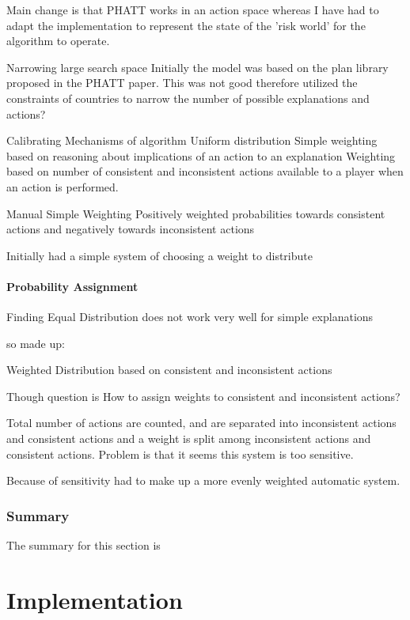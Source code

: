 \documentclass[parskip]{cs4rep}
\begin{document}
Main change is that PHATT works in an action space whereas I have had to adapt the implementation to represent the state of the 'risk world' for the algorithm to operate.

Narrowing large search space
Initially the model was based on the plan library proposed in the PHATT paper. This was not good therefore utilized the constraints of countries to narrow the number of possible explanations and actions?

Calibrating Mechanisms of algorithm
Uniform distribution
Simple weighting based on reasoning about implications of an action to an explanation
Weighting based on number of consistent and inconsistent actions available to a player when an action is performed.

Manual Simple Weighting
Positively weighted probabilities towards consistent actions and negatively towards inconsistent actions

Initially had a simple system of choosing a weight to distribute

\subsubsection{Probability Assignment}

Finding
Equal Distribution does not work very well for simple explanations

so made up:

Weighted Distribution based on consistent and inconsistent actions

Though question is How to assign weights to consistent and inconsistent actions?

Total number of actions are counted, and are separated into inconsistent actions and consistent actions and a weight is split among inconsistent actions and consistent actions. Problem is that it seems this system is too sensitive.

Because of sensitivity had to make up a more evenly weighted automatic system.

\subsection{Summary}

The summary for this section is

\chapter{Implementation}
\end{document}
